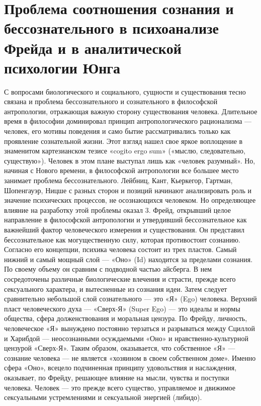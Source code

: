 \documentclass[12pt]{article}
\begin{document}
\section{Проблема соотношения сознания и бессознательного в психоанализе Фрейда и в аналитической психологии Юнга}
С  вопросами  биологического  и  социального,  сущности  и  существования  тесно  связана  и  проблема
бессознательного и сознательного в философской антропологии, отражающая важную сторону существования
человека.
Длительное  время  в  философии  доминировал  принцип  антропологического  рационализма  —  человек,  его
мотивы поведения и само бытие рассматривались только как проявление сознательной жизни. Этот взгляд
нашел свое яркое воплощение в знаменитом картезианском тезисе «cogito ergo sum» («мыслю, следовательно,
существую»). Человек в этом плане выступал лишь как «человек разумный». Но, начиная с Нового времени, в
философской антропологии все большее место занимает проблема бессознательного.
Лейбниц, Кант, Кьеркегор, Гартман, Шопенгауэр, Ницше с разных сторон и позиций начинают анализировать
роль и значение психических процессов, не осознающихся человеком.
Но определяющее влияние на разработку этой проблемы оказал 3. Фрейд, открывший целое направление в
философской антропологии и утвердивший бессознательное как важнейший фактор человеческого измерения и
существования. Он представил бессознательное как могущественную силу, которая противостоит сознанию.
Согласно его концепции, психика человека состоит из трех пластов. Самый нижний и самый мощный слой —
«Оно» (Id) находится за пределами сознания. По своему объему он сравним с подводной частью айсберга. В
нем  сосредоточены  различные  биологические влечения и страсти,  прежде  всего сексуального  характера, и
вытесненные из сознания идеи. Затем следует сравнительно небольшой слой сознательного — это «Я» (Ego)
человека. Верхний пласт человеческого духа — «Сверх-Я» (Super Ego) — это идеалы и нормы общества, сфера
долженствования  и  моральная  цензура.  По  Фрейду,  личность,  человеческое  «Я»  вынуждено  постоянно
терзаться и разрываться между Сциллой и Харибдой — неосознанными осуждаемыми «Оно» и нравственно-культурной цензурой «Сверх-Я». Таким образом, оказывается, что собственное «Я» — сознание человека — не
является  «хозяином  в  своем  собственном  доме».  Именно  сфера  «Оно»,  всецело  подчиненная  принципу
удовольствия и наслаждения, оказывает, по Фрейду, решающее влияние на мысли, чувства и поступки человека.
Человек — это прежде всего существо, управляемое и движимое сексуальными устремлениями и сексуальной
энергией (либидо).
\end{document}
